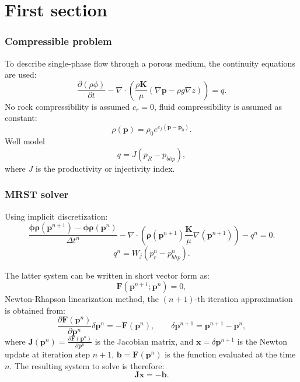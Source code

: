 \documentclass{beamer}
\begin{document}
 
\frame{\titlepage}


\section{First section}
\begin{frame}
\frametitle{Compressible problem}

To describe single-phase flow through a porous medium, the continuity equations are used:
\begin{equation}\label{eq:ce1}
\frac{\partial (\rho \phi)}{\partial t}- \nabla \cdot \left( \frac{\rho\mathbf{K}}{\mu}(\nabla \mathbf{p}-\rho g\nabla z)\right)=q.
\end{equation}
No rock compressibility is assumed $c_r=0$, fluid compressibility is assumed as constant:
\begin{equation}\label{eq:rhoeq}
 \rho(\mathbf{p})=\rho_0 e^{c_f(\mathbf{p}-\mathbf{p}_0)}.
\end{equation}
Well model\\
$$q=J(p_R-p_{bhp}),$$
where $J$ is the productivity or injectivity index.
\end{frame}
\begin{frame}[shrink=20]
\frametitle{MRST solver}
Using implicit discretization:
\begin{equation}\label{eq:ce4}
 \frac{\mathbf{\phi}\mathbf{\rho}(\mathbf{p}^{n+1})
 -\mathbf{\phi}\mathbf{\rho}(\mathbf{p}^{n})}{\Delta t^n}
 -\nabla \cdot (\mathbf{\rho}(\mathbf{p}^{n+1}) 
 \frac{\mathbf{K}}{\mu}\nabla(\mathbf{p}^{n+1}))-{q}^{n}=0.
\end{equation}
$$q_{}^n=W_j(p_{r}^{n}-p_{bhp}^{n}).$$

The latter system can be written in short vector form as:
\begin{equation}\label{NR}
 \mathbf{F}(\mathbf{p}^{n+1};\mathbf{p}^n)=0,
\end{equation}
Newton-Rhapson linearization method, the $(n+1)$-th iteration approximation is obtained from:
$$\frac{\partial \mathbf{F}(\mathbf{p}^n)}{\partial \mathbf{p}^n}\delta\mathbf{p}^n=-\mathbf{F}(\mathbf{p}^n),
\qquad \delta \mathbf{p}^{n+1} =\mathbf{p}^{n+1}-\mathbf{p}^n,$$
where $\mathbf{J}(\mathbf{p}^n)=\frac{\partial \mathbf{F}(\mathbf{p}^n)}{\partial \mathbf{p}^n}$ is the 
Jacobian matrix, and $\mathbf{x}=\delta \mathbf{p}^{n+1}$ is the Newton update at iteration step $n+1$,
$\mathbf{b}=\mathbf{F}(\mathbf{p}^n)$ is the function evaluated at the time $n$.
The resulting system to solve is therefore:
$$\mathbf{J}\mathbf{x}=-\mathbf{b}.$$
\end{frame}
\end{document}
